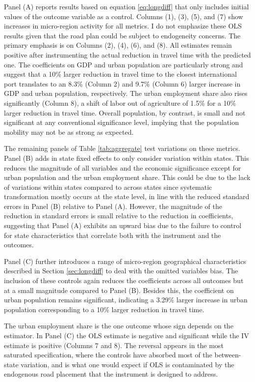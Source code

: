 \documentclass[11pt]{article}
\begin{document}
Panel (A) reports results based on equation \eqref{eq:longdiff} that only includes initial values of the outcome variable as a control. Columns (1), (3), (5), and (7) show increases in micro-region activity for all metrics. I do not emphasize these OLS results given that the road plan could be subject to endogeneity concerns. The primary emphasis is on Columns (2), (4), (6), and (8). All estimates remain positive after instrumenting the actual reduction in travel time with the predicted one. The coefficients on GDP and urban population are particularly strong and suggest that a 10\% larger reduction in travel time to the closest international port translates to an 8.3\% (Column 2) and 9.7\% (Column 6) larger increase in GDP and urban population, respectively. The urban employment share also rises significantly (Column 8), a shift of labor out of agriculture of 1.5\% for a 10\% larger reduction in travel time. Overall population, by contrast, is small and not significant at any conventional significance level, implying that the population mobility may not be as strong as expected.

The remaining panels of Table \ref{tab:aggregate} test variations on these metrics. Panel (B) adds in state fixed effects to only consider variation within states. This reduces the magnitude of all variables and the economic significance except for urban population and the urban employment share. This could be due to the lack of variations within states compared to across states since systematic transformation mostly occurs at the state level, in line with the reduced standard errors in Panel (B) relative to Panel (A). However, the magnitude of the reduction in standard errors is small relative to the reduction in coefficients, suggesting that Panel (A) exhibits an upward bias due to the failure to control for state characteristics that correlate both with the instrument and the outcomes. 

Panel (C) further introduces a range of micro-region geographical characteristics described in Section \ref{sec:longdiff} to deal with the omitted variables bias. The inclusion of these controls again reduces the coefficients across all outcomes but at a small magnitude compared to Panel (B). Besides this, the coefficient on urban population remains significant, indicating a 3.29\% larger increase in urban population corresponding to a 10\% larger reduction in travel time.

The urban employment share is the one outcome whose sign depends on the estimator. In Panel (C) the OLS estimate is negative and significant while the IV estimate is positive (Columns 7 and 8). The reversal appears in the most saturated specification, where the controls have absorbed most of the between-state variation, and is what one would expect if OLS is contaminated by the endogenous road placement that the instrument is designed to address.
\end{document}
